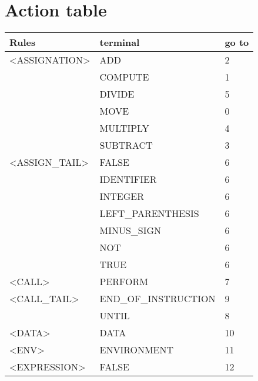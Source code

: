 \newpage\cleardoublepage{}
\section{Action table}
\label{app:action table}



\begin{longtable}{|l|l|l|}
\hline
\textbf{Rules}       &   \textbf{terminal}    &   \textbf{go to}       \\
\hline
<ASSIGNATION>                            &   ADD                  &   2 \\ \hline
                     &   COMPUTE              &   1 \\ \hline
                     &   DIVIDE               &   5 \\ \hline
                     &   MOVE                 &   0 \\ \hline
                     &   MULTIPLY             &   4 \\ \hline
                     &   SUBTRACT             &   3 \\ \hline
<ASSIGN\_TAIL>                           &   FALSE                &   6 \\ \hline
                     &   IDENTIFIER           &   6 \\ \hline
                     &   INTEGER              &   6 \\ \hline
                     &   LEFT\_PARENTHESIS    &   6 \\ \hline
                     &   MINUS\_SIGN          &   6 \\ \hline
                     &   NOT                  &   6 \\ \hline
                     &   TRUE                 &   6 \\ \hline
<CALL>                                   &   PERFORM              &   7 \\ \hline
<CALL\_TAIL>                             &   END\_OF\_INSTRUCTION &   9 \\ \hline
                     &   UNTIL                &   8 \\ \hline
<DATA>                                   &   DATA                 &   10 \\ \hline
<ENV>                                    &   ENVIRONMENT          &   11 \\ \hline
<EXPRESSION>                             &   FALSE                &   12 \\ \hline

\end{longtable}
